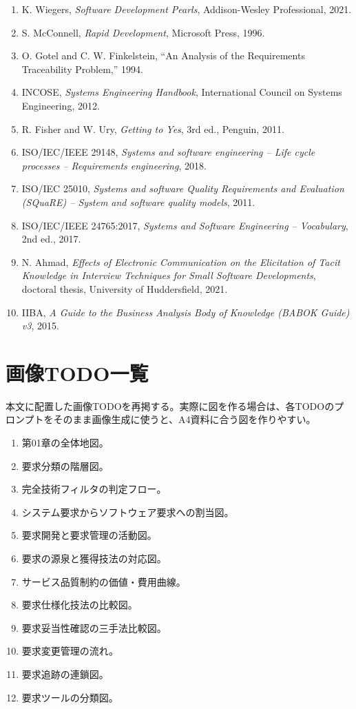 \documentclass[uplatex,10pt,dvipdfmx,nomag]{jsarticle}
\begin{document}
\begin{enumerate}[leftmargin=2.2em,itemsep=.15ex]
\item K. Wiegers, \textit{Software Development Pearls}, Addison-Wesley Professional, 2021.
\item S. McConnell, \textit{Rapid Development}, Microsoft Press, 1996.
\item O. Gotel and C. W. Finkelstein, ``An Analysis of the Requirements Traceability Problem,'' 1994.
\item INCOSE, \textit{Systems Engineering Handbook}, International Council on Systems Engineering, 2012.
\item R. Fisher and W. Ury, \textit{Getting to Yes}, 3rd ed., Penguin, 2011.
\item ISO/IEC/IEEE 29148, \textit{Systems and software engineering -- Life cycle processes -- Requirements engineering}, 2018.
\item ISO/IEC 25010, \textit{Systems and software Quality Requirements and Evaluation (SQuaRE) -- System and software quality models}, 2011.
\item ISO/IEC/IEEE 24765:2017, \textit{Systems and Software Engineering -- Vocabulary}, 2nd ed., 2017.
\item N. Ahmad, \textit{Effects of Electronic Communication on the Elicitation of Tacit Knowledge in Interview Techniques for Small Software Developments}, doctoral thesis, University of Huddersfield, 2021.
\item IIBA, \textit{A Guide to the Business Analysis Body of Knowledge (BABOK Guide) v3}, 2015.
\end{enumerate}
\normalsize

\section{画像TODO一覧}

本文に配置した画像TODOを再掲する。実際に図を作る場合は、各TODOのプロンプトをそのまま画像生成に使うと、A4資料に合う図を作りやすい。

\begin{enumerate}
\item 第01章の全体地図。
\item 要求分類の階層図。
\item 完全技術フィルタの判定フロー。
\item システム要求からソフトウェア要求への割当図。
\item 要求開発と要求管理の活動図。
\item 要求の源泉と獲得技法の対応図。
\item サービス品質制約の価値・費用曲線。
\item 要求仕様化技法の比較図。
\item 要求妥当性確認の三手法比較図。
\item 要求変更管理の流れ。
\item 要求追跡の連鎖図。
\item 要求ツールの分類図。
\end{enumerate}
\end{document}
